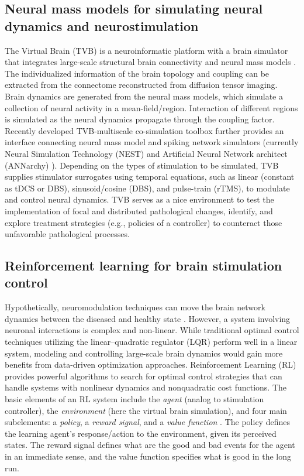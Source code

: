 \documentclass[12pt, a4paper]{article}
\begin{document}
\subsection*{Neural mass models for simulating neural dynamics and neurostimulation}
The Virtual Brain (TVB) is a neuroinformatic platform with a brain simulator that integrates large-scale structural brain connectivity and neural mass models \parencite{ritterVirtualBrainIntegrates2013a}. The individualized information of the brain topology and coupling can be extracted from the connectome reconstructed from diffusion tensor imaging. Brain dynamics are generated from the neural mass models, which simulate a collection of neural activity in a mean-field/region. Interaction of different regions is simulated as the neural dynamics propagate through the coupling factor. %
Recently developed TVB-multiscale co-simulation toolbox \parencite{schirnerBrainSimulationCloud2022} further provides an interface connecting neural mass model and spiking network simulators (currently Neural Simulation Technology (NEST) \parencite{epplerPyNESTConvenientInterface2008} and Artificial Neural Network architect (ANNarchy) \parencite{vitayANNarchyCodeGeneration2015}).
Depending on the types of stimulation to be simulated, TVB supplies stimulator surrogates using temporal equations, such as linear (constant as tDCS or DBS), sinusoid/cosine (DBS), and pulse-train (rTMS), to modulate and control neural dynamics.
TVB serves as a nice environment to test the implementation of focal and distributed pathological changes, identify, and explore treatment strategies (e.g., policies of a controller) to counteract those unfavorable pathological processes.

\subsection*{Reinforcement learning for brain stimulation control}
Hypothetically, neuromodulation techniques can move the brain network dynamics between the diseased and healthy state \parencite{meierVirtualDeepBrain2021,stefanovskiLinkingMolecularPathways2019a}. %
However, a system involving neuronal interactions is complex and non-linear. While traditional optimal control techniques utilizing the linear–quadratic regulator (LQR) perform well in a linear system, modeling and controlling large-scale brain dynamics would gain more benefits from data-driven optimization approaches. Reinforcement Learning (RL) provides powerful algorithms to search for optimal control strategies that can handle systems with nonlinear dynamics and nonquadratic cost functions. The basic elements of an RL system include the \textit{agent} (analog to stimulation controller), the \textit{environment} (here the virtual brain simulation), and four main subelements: a \textit{policy}, a \textit{reward signal}, and a \textit{value function} \parencite{suttonReinforcementLearningIntroduction2018}. The policy defines the learning agent's response/action to the environment, given its perceived states. The reward signal defines what are the good and bad events for the agent in an immediate sense, and the value function specifies what is good in the long run.
\end{document}
